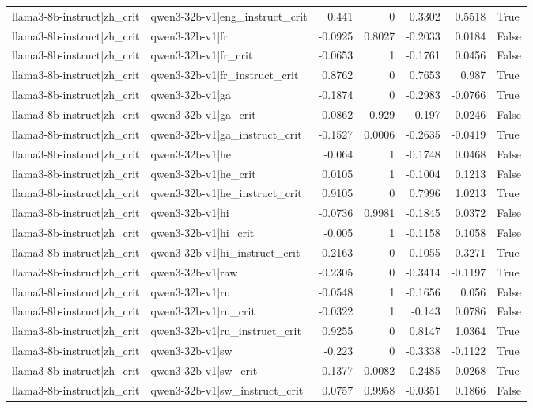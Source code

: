 \begin{table}
\begin{tabular}{l l r r r r l}
llama3-8b-instruct|zh_crit & qwen3-32b-v1|eng_instruct_crit & 0.441 & 0 & 0.3302 & 0.5518 & True \\
llama3-8b-instruct|zh_crit & qwen3-32b-v1|fr & -0.0925 & 0.8027 & -0.2033 & 0.0184 & False \\
llama3-8b-instruct|zh_crit & qwen3-32b-v1|fr_crit & -0.0653 & 1 & -0.1761 & 0.0456 & False \\
llama3-8b-instruct|zh_crit & qwen3-32b-v1|fr_instruct_crit & 0.8762 & 0 & 0.7653 & 0.987 & True \\
llama3-8b-instruct|zh_crit & qwen3-32b-v1|ga & -0.1874 & 0 & -0.2983 & -0.0766 & True \\
llama3-8b-instruct|zh_crit & qwen3-32b-v1|ga_crit & -0.0862 & 0.929 & -0.197 & 0.0246 & False \\
llama3-8b-instruct|zh_crit & qwen3-32b-v1|ga_instruct_crit & -0.1527 & 0.0006 & -0.2635 & -0.0419 & True \\
llama3-8b-instruct|zh_crit & qwen3-32b-v1|he & -0.064 & 1 & -0.1748 & 0.0468 & False \\
llama3-8b-instruct|zh_crit & qwen3-32b-v1|he_crit & 0.0105 & 1 & -0.1004 & 0.1213 & False \\
llama3-8b-instruct|zh_crit & qwen3-32b-v1|he_instruct_crit & 0.9105 & 0 & 0.7996 & 1.0213 & True \\
llama3-8b-instruct|zh_crit & qwen3-32b-v1|hi & -0.0736 & 0.9981 & -0.1845 & 0.0372 & False \\
llama3-8b-instruct|zh_crit & qwen3-32b-v1|hi_crit & -0.005 & 1 & -0.1158 & 0.1058 & False \\
llama3-8b-instruct|zh_crit & qwen3-32b-v1|hi_instruct_crit & 0.2163 & 0 & 0.1055 & 0.3271 & True \\
llama3-8b-instruct|zh_crit & qwen3-32b-v1|raw & -0.2305 & 0 & -0.3414 & -0.1197 & True \\
llama3-8b-instruct|zh_crit & qwen3-32b-v1|ru & -0.0548 & 1 & -0.1656 & 0.056 & False \\
llama3-8b-instruct|zh_crit & qwen3-32b-v1|ru_crit & -0.0322 & 1 & -0.143 & 0.0786 & False \\
llama3-8b-instruct|zh_crit & qwen3-32b-v1|ru_instruct_crit & 0.9255 & 0 & 0.8147 & 1.0364 & True \\
llama3-8b-instruct|zh_crit & qwen3-32b-v1|sw & -0.223 & 0 & -0.3338 & -0.1122 & True \\
llama3-8b-instruct|zh_crit & qwen3-32b-v1|sw_crit & -0.1377 & 0.0082 & -0.2485 & -0.0268 & True \\
llama3-8b-instruct|zh_crit & qwen3-32b-v1|sw_instruct_crit & 0.0757 & 0.9958 & -0.0351 & 0.1866 & False \\

\end{tabular}
\end{table}
